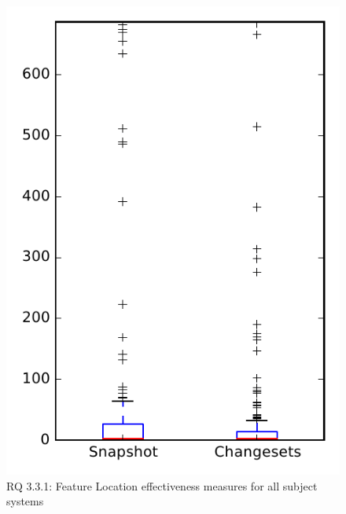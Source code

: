 
\begin{figure}
\centering
\includegraphics[height=0.4\textheight]{figures/flt_seed/rq1_overview}
\caption{RQ 3.3.1: Feature Location effectiveness measures for all subject systems}
\label{fig:flt_seed:rq1:overview}
\end{figure}
